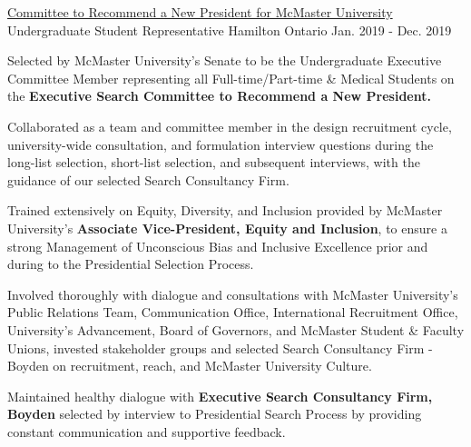 \begin{cventries}


  \cventry
  {\href{ https://secretariat.mcmaster.ca/app/uploads/2019/03/Membership-List-1.pdf}{Committee to Recommend a New President for McMaster University}} %
     {Undergraduate Student Representative} %
    {Hamilton Ontario} %
    {Jan. 2019 - Dec. 2019} %
     {\renewcommand{\labelitemii}{\bullet}
      \begin{cvitems}%
        \item {Selected by McMaster University's Senate to be the Undergraduate Executive Committee Member representing all Full-time/Part-time \& Medical Students on the \textbf{Executive Search Committee to Recommend a New President.}}
        \item{Collaborated as a team and committee member in the design recruitment cycle, university-wide consultation, and formulation interview questions during the long-list selection, short-list selection, and subsequent interviews, with the guidance of our selected Search Consultancy Firm.}
        \item{Trained extensively on Equity, Diversity, and Inclusion provided by McMaster University's \textbf{Associate Vice-President, Equity and Inclusion}, to ensure a strong Management of Unconscious Bias and Inclusive Excellence prior and during to the Presidential Selection Process.}
        \item{Involved thoroughly with dialogue and consultations with McMaster University's Public Relations Team, Communication Office, International Recruitment Office, University's Advancement, Board of Governors, and McMaster Student \& Faculty Unions, invested stakeholder groups and selected Search Consultancy Firm - Boyden on recruitment, reach, and McMaster University Culture.}
        \item{Maintained healthy dialogue with \textbf{Executive Search Consultancy Firm, Boyden } selected by interview to Presidential Search Process by providing constant communication and supportive feedback.}

\end{cvitems}}
\end{cventries}
